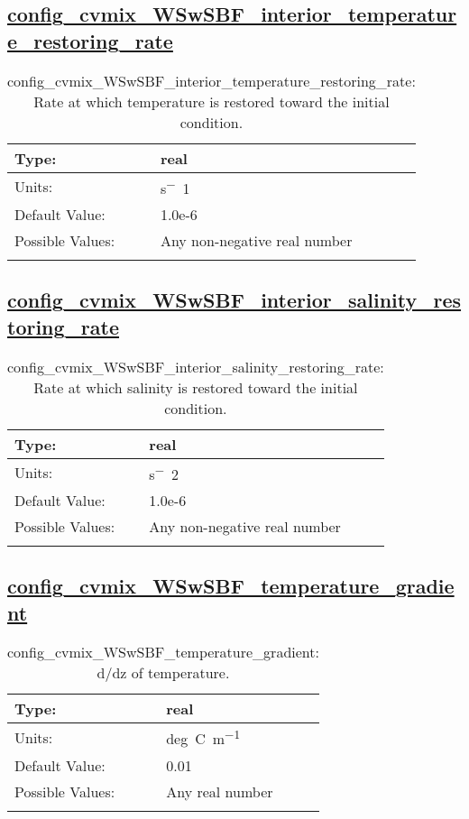 \subsection[config\_cvmix\_WSwSBF\_interior\_temperature\_restoring\_rate]{\hyperref[sec:nm_tab_cvmix_WSwSBF]{config\_cvmix\_WSwSBF\_interior\_temperature\_restoring\_rate}}
\label{subsec:nm_sec_config_cvmix_WSwSBF_interior_temperature_restoring_rate}
\begin{center}
\begin{longtable}{| p{2.0in} || p{4.0in} |}
    \hline
    Type: & real \\
    \hline
    Units: & \si{{s}^-1} \\
    \hline
    Default Value: & 1.0e-6 \\
    \hline
    Possible Values: & Any non-negative real number \\
    \hline
    \caption{config\_cvmix\_WSwSBF\_interior\_temperature\_restoring\_rate: Rate at which temperature is restored toward the initial condition.}
\end{longtable}
\end{center}
\subsection[config\_cvmix\_WSwSBF\_interior\_salinity\_restoring\_rate]{\hyperref[sec:nm_tab_cvmix_WSwSBF]{config\_cvmix\_WSwSBF\_interior\_salinity\_restoring\_rate}}
\label{subsec:nm_sec_config_cvmix_WSwSBF_interior_salinity_restoring_rate}
\begin{center}
\begin{longtable}{| p{2.0in} || p{4.0in} |}
    \hline
    Type: & real \\
    \hline
    Units: & \si{{s}^-2} \\
    \hline
    Default Value: & 1.0e-6 \\
    \hline
    Possible Values: & Any non-negative real number \\
    \hline
    \caption{config\_cvmix\_WSwSBF\_interior\_salinity\_restoring\_rate: Rate at which salinity is restored toward the initial condition.}
\end{longtable}
\end{center}
\subsection[config\_cvmix\_WSwSBF\_temperature\_gradient]{\hyperref[sec:nm_tab_cvmix_WSwSBF]{config\_cvmix\_WSwSBF\_temperature\_gradient}}
\label{subsec:nm_sec_config_cvmix_WSwSBF_temperature_gradient}
\begin{center}
\begin{longtable}{| p{2.0in} || p{4.0in} |}
    \hline
    Type: & real \\
    \hline
    Units: & \si{deg.C.m^{-1}} \\
    \hline
    Default Value: & 0.01 \\
    \hline
    Possible Values: & Any real number \\
    \hline
    \caption{config\_cvmix\_WSwSBF\_temperature\_gradient: d/dz of temperature.}
\end{longtable}
\end{center}
